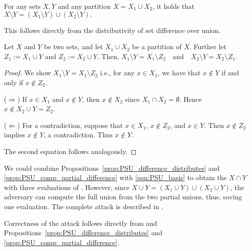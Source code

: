 \begin{prop}\label{prop:PSU_difference_distributes}
For any sets $X, Y$ and any partition $X = X_1 \cup X_2$, it holds that
$X \setminus Y = (X_1 \setminus Y) \cup (X_2 \setminus Y).$
\end{prop}

This follows directly from the distributivity of set difference over union.

\begin{prop}\label{prop:PSU_comp_partial_difference}
Let $X$ and $Y$ be two sets, and let $X_1 \cup X_2$ be a partition of $X$.
Further let $Z_1 := X_1 \cup Y$ and $Z_2 := X_2 \cup Y$.
Then, $X_1 \setminus Y = X_1 \setminus Z_2 \quad \text{and} \quad X_2 \setminus Y = X_2 \setminus Z_1.$
\end{prop}
\begin{proof}
We show $X_1 \setminus Y = X_1 \setminus Z_2$ i.e.,
for any $x \in X_1$, we have that $x \notin Y$ if and only if $x \notin Z_2$. 

($\Rightarrow$)  
If $x \in X_1$ and $x \notin Y$, then $x \notin X_2$ since $X_1 \cap X_2 = \emptyset$.  
Hence $x \notin X_2 \cup Y = Z_2$.

($\Leftarrow$)  
For a contradiction, suppose that $x \in X_1$, $x \notin Z_2$, and $x \in Y$. Then $x \notin Z_2$ implies $x \notin Y$, a contradiction.  
Thus $x \notin Y$.

The second equation follows analogously.
\end{proof}


We could combine Propositions~\ref{prop:PSU_difference_distributes} and \ref{prop:PSU_comp_partial_difference}
with \cref{eqn:PSU_basis} to obtain the $X \cap Y$ with three evaluations of \PSU.
However, since $X \cup Y = (X_1 \cup Y) \cup (X_2 \cup Y)$, the adversary can compute the full union from the two partial unions,
thus, saving one evaluation.
The complete attack \PSUattack{} is described in .


Correctness of the attack follows directly from  and Propositions~\ref{prop:PSU_difference_distributes} and \ref{prop:PSU_comp_partial_difference}.

